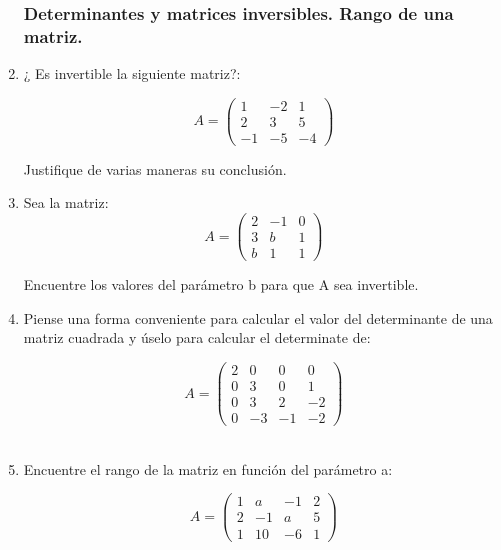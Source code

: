 \begin{enumerate}
\subsubsection{Determinantes y matrices inversibles. Rango de una matriz.}

\bigskip

 \item

¿ Es invertible la siguiente matriz?:

\bigskip

\[A= \left(\begin{array}{ccc}1 & -2 & 1 \\ 2 & 3 & 5\\ -1 & -5 & -4
\end{array}
 \right)
 \]

 \bigskip
 
 Justifique de varias maneras su conclusión.
 
 \item
 
 Sea la matriz:\\
 \[A= \left(\begin{array}{ccc}2 & -1 & 0 \\ 3 & b & 1\\ b & 1 & 1
\end{array}
 \right)
 \]

 \bigskip
 
Encuentre los valores del parámetro b para que A sea invertible.

\bigskip




\item

Piense una forma conveniente para calcular el valor del determinante de una matriz cuadrada y \'uselo para calcular
el determinate de: 

\[A= \left(\begin{array}{cccc}2 & 0 & 0 & 0 \\ 0 & 3 & 0 & 1\\ 0 & 3 & 2 & -2\\ 0 & -3& -1& -2
\end{array}
 \right)
 \]\\
 
 \item
Encuentre el rango de la matriz en función del parámetro a:

\[A= \left(\begin{array}{cccc}1 & a & -1 & 2 \\ 2 & -1 & a & 5\\ 1 & 10 & -6 & 1
\end{array}
 \right)
 \]


\end{enumerate}
